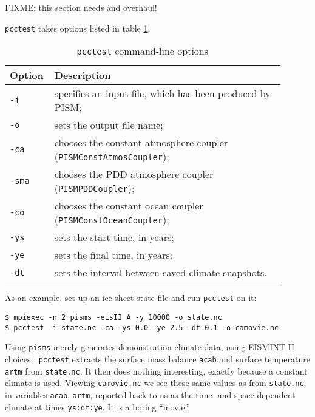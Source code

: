 FIXME: this section needs and overhaul!

\verb|pcctest| takes options listed in table \ref{tab:pcctest}.

\begin{table}[ht]
  \caption{\texttt{pcctest} command-line options}
  \centering
  \begin{tabular}{p{0.1\linewidth}p{0.8\linewidth}}\hline
    \textbf{Option} & \textbf{Description}\\
    \hline
    \texttt{-i} & specifies an input file, which has been produced by PISM;\\
    \texttt{-o} & sets the output file name;\\
    \texttt{-ca} &chooses the constant atmosphere coupler (\verb|PISMConstAtmosCoupler|);\\
    \texttt{-sma} & chooses the PDD atmosphere coupler (\verb|PISMPDDCoupler|);\\
    \texttt{-co} & chooses the constant ocean coupler (\verb|PISMConstOceanCoupler|);\\
    \texttt{-ys} & sets the start time, in years;\\
    \texttt{-ye} & sets the final time, in years;\\
    \texttt{-dt} & sets the interval between saved climate snapshots.\\
    \hline
 \end{tabular}
 \label{tab:pcctest}
\end{table}

\bigskip
As an example, set up an ice sheet state file and run \verb|pcctest| on it:
\begin{verbatim}
$ mpiexec -n 2 pisms -eisII A -y 10000 -o state.nc
$ pcctest -i state.nc -ca -ys 0.0 -ye 2.5 -dt 0.1 -o camovie.nc
\end{verbatim}
Using \verb|pisms| merely generates demonstration climate data, using
EISMINT II choices \cite{EISMINT00}.  \verb|pcctest| extracts the 
surface mass balance \verb|acab| and surface temperature \verb|artm| from \verb|state.nc|.
It then does nothing interesting, exactly because a constant climate
is used.  Viewing \verb|camovie.nc| we see these same values as from \verb|state.nc|,
in variables \verb|acab|, \verb|artm|, reported back to us as the time- and space-dependent
climate at times \verb|ys:dt:ye|.  It is a boring ``movie.''

